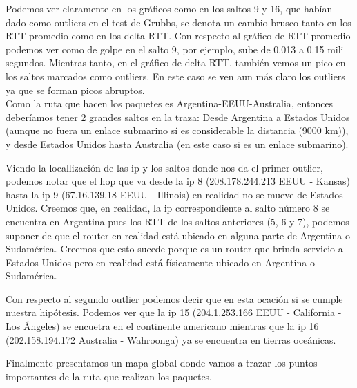Podemos ver claramente en los gr\'aficos como en los saltos 9 y 16, que hab\'ian dado como outliers en el test de Grubbs, se denota un cambio brusco tanto en los RTT promedio como en los delta RTT. Con respecto al gr\'afico de RTT promedio podemos ver como de golpe en el salto 9, por ejemplo, sube de 0.013 a 0.15 mili segundos. Mientras tanto, en el gr\'afico de delta RTT, tambi\'en vemos un pico en los saltos marcados como outliers. En este caso se ven aun m\'as claro los outliers ya que se forman picos abruptos.\\
Como la ruta que hacen los paquetes es Argentina-EEUU-Australia, entonces deber\'iamos tener 2 grandes saltos en la traza: Desde Argentina a Estados Unidos (aunque no fuera un enlace submarino s\'i es considerable la distancia (9000 km)), y desde Estados Unidos hasta Australia (en este caso si es un enlace submarino). \newline

Viendo la locallizaci\'on de las ip y los saltos donde nos da el primer outlier, podemos notar que el hop que va desde la  ip 8 (208.178.244.213  EEUU - Kansas) hasta la ip 9 (67.16.139.18     EEUU - Illinois) en realidad no se mueve de Estados Unidos. Creemos que, en realidad, la ip correspondiente al salto n\'umero 8 se encuentra en Argentina pues los RTT de los saltos anteriores (5, 6 y 7), podemos suponer de que el router en realidad est\'a ubicado en alguna parte de Argentina o Sudam\'erica. Creemos que esto sucede porque es un router que brinda servicio a Estados Unidos pero en realidad est\'a f\'isicamente ubicado en Argentina o Sudam\'erica.  \newline

Con respecto al segundo outlier podemos decir que en esta ocaci\'on si se cumple nuestra hip\'otesis. Podemos ver que la ip 15 (204.1.253.166    EEUU - California - Los \'Angeles) se encuetra en el continente americano mientras que la ip 16 (202.158.194.172  Australia - Wahroonga) ya se encuentra en tierras oce\'anicas. \newline

Finalmente presentamos un mapa global donde vamos a trazar los puntos importantes de la ruta que realizan los paquetes. 



